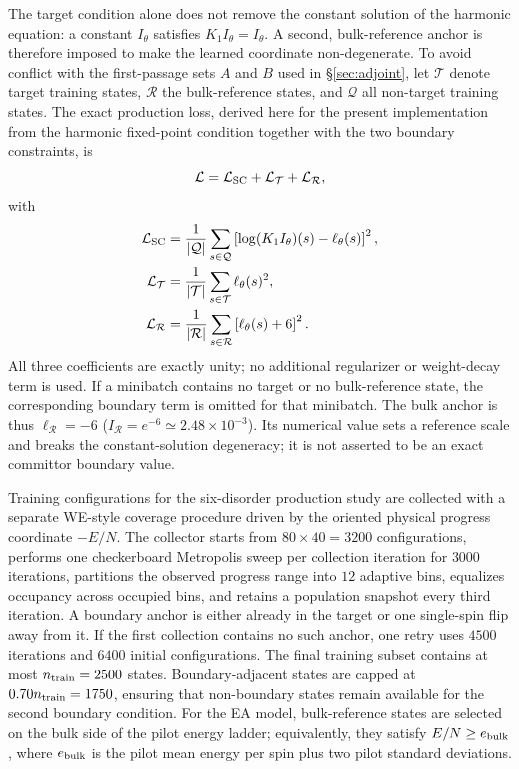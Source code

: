 \documentclass[a4paper,fleqn]{cas-sc}
\begin{document}
The target condition alone does not remove the constant solution of the harmonic equation: a
constant $I_\theta$ satisfies $K_1 I_\theta=I_\theta$.  A second, bulk-reference anchor is
therefore imposed to make the learned coordinate non-degenerate.  To avoid conflict with the
first-passage sets $A$ and $B$ used in \S\ref{sec:adjoint}, let $\mathcal T$ denote target
training states, $\mathcal R$ the bulk-reference states, and $\mathcal Q$ all non-target
training states.  The exact production loss, derived here for the present implementation from the harmonic
fixed-point condition together with the two boundary constraints, is
\begin{equation}
\mathcal L=\mathcal L_{\rm SC}+\mathcal L_{\mathcal T}+\mathcal L_{\mathcal R},
\label{eq:nloss}
\end{equation}
with
\begin{align}
\mathcal L_{\rm SC}
 &=\frac{1}{|\mathcal Q|}\sum_{s\in\mathcal Q}
 \left[\log(K_1I_\theta)(s)-\ell_\theta(s)\right]^2,\nonumber\\
\mathcal L_{\mathcal T}
 &=\frac{1}{|\mathcal T|}\sum_{s\in\mathcal T}\ell_\theta(s)^2,\nonumber\\
\mathcal L_{\mathcal R}
 &=\frac{1}{|\mathcal R|}\sum_{s\in\mathcal R}
 \left[\ell_\theta(s)+6\right]^2.
\label{eq:nlossparts}
\end{align}
All three coefficients are exactly unity; no additional regularizer or weight-decay term is
used.  If a minibatch contains no target or no bulk-reference state, the corresponding boundary
term is omitted for that minibatch.  The bulk anchor is thus
$\ell_{\mathcal R}=-6$ ($I_{\mathcal R}=e^{-6}\simeq2.48\times10^{-3}$).  Its numerical value
sets a reference scale and breaks the constant-solution degeneracy; it is not asserted to be an
exact committor boundary value.

Training configurations for the six-disorder production study are collected with a separate
WE-style coverage procedure driven by the oriented physical progress coordinate $-E/N$.
The collector starts from $80\times40=3200$ configurations, performs one checkerboard
Metropolis sweep per collection iteration for $3000$ iterations, partitions the observed
progress range into $12$ adaptive bins, equalizes occupancy across occupied bins, and retains a
population snapshot every third iteration.  A boundary anchor is either already in the target
or one single-spin flip away from it.  If the first collection contains no such anchor, one
retry uses $4500$ iterations and $6400$ initial configurations.  The final training subset
contains at most $n_{\rm train}=2500$ states.  Boundary-adjacent states are capped at
$0.70n_{\rm train}=1750$, ensuring that non-boundary states remain available for the second
boundary condition.  For the EA model, bulk-reference states are selected on the bulk side of
the pilot energy ladder; equivalently, they satisfy $E/N\ge e_{\rm bulk}$, where
$e_{\rm bulk}$ is the pilot mean energy per spin plus two pilot standard deviations.
\end{document}
